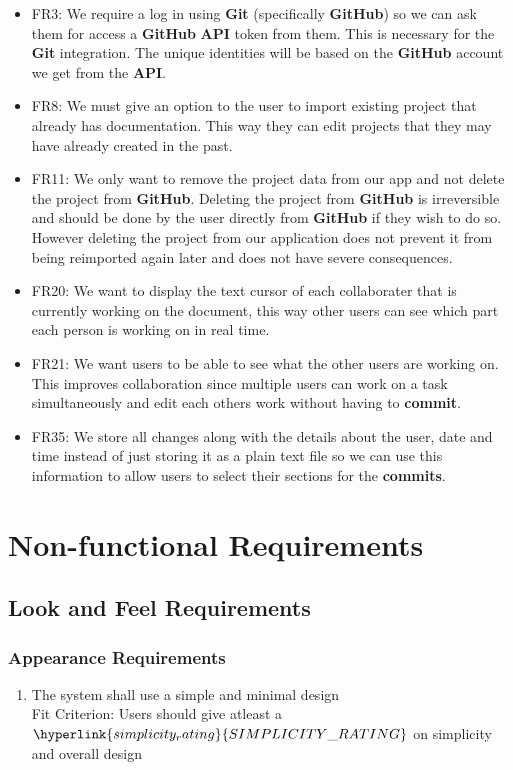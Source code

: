 \documentclass[12pt, titlepage]{article}
\begin{document}
\begin{enumerate}[{UE}1.]
		\begin{itemize}
			\item FR3: We require a log in using \textbf{Git} (specifically \textbf{GitHub}) so we can ask them for access a \textbf{GitHub} \textbf{API} token from them. This is necessary for the \textbf{Git} integration. The unique identities will be based on the \textbf{GitHub} account we get from the \textbf{API}.
			\item FR8: We must give an option to the user to import existing project that already has documentation. This way they can edit projects that they may have already created in the past.
			\item FR11: We only want to remove the project data from our app and not delete the project from \textbf{GitHub}. Deleting the project from \textbf{GitHub} is irreversible and should be done by the user directly from \textbf{GitHub} if they wish to do so. However deleting the project from our application does not prevent it from being reimported again later and does not have severe consequences.
			\item FR20: We want to display the text cursor of each collaborater that is currently working on the document, this way other users can see which part each person is working on in real time.
			\item FR21: We want users to be able to see what the other users are working on. This improves collaboration since multiple users can work on a task simultaneously and edit each others work without having to \textbf{commit}.
			\item FR35: We store all changes along with the details about the user, date and time instead of just storing it as a plain text file so we can use this information to allow users to select their sections for the \textbf{commits}.
		\end{itemize}
		
	\end{enumerate}
	
	\section{Non-functional Requirements}
	
	\subsection{Look and Feel Requirements}
	\subsubsection{Appearance Requirements}
	\begin{enumerate}[{NFR}1.]
		\item The system shall use a simple and minimal design\\
		{\color{red}Fit Criterion: Users should give atleast a $\hyperlink{simplicity_rating}{SIMPLICITY\_RATING}$ on simplicity and overall design}
	\end{enumerate}
\end{document}
